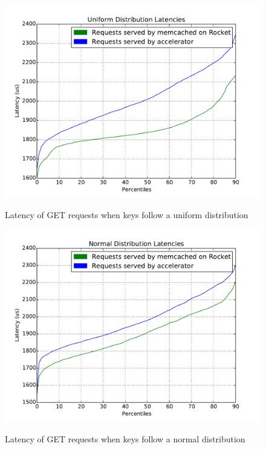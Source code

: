 \begin{figure}[t]
\begin{center}
\label{fig:unif}
\includegraphics[width=\linewidth]{unif.pdf}
\caption{Latency of GET requests when keys follow a uniform distribution}
\end{center}
\end{figure}

\begin{figure}[t]
\begin{center}
\label{fig:norm}
\includegraphics[width=\linewidth]{norm.pdf}
\caption{Latency of GET requests when keys follow a normal distribution}
\end{center}
\end{figure}

